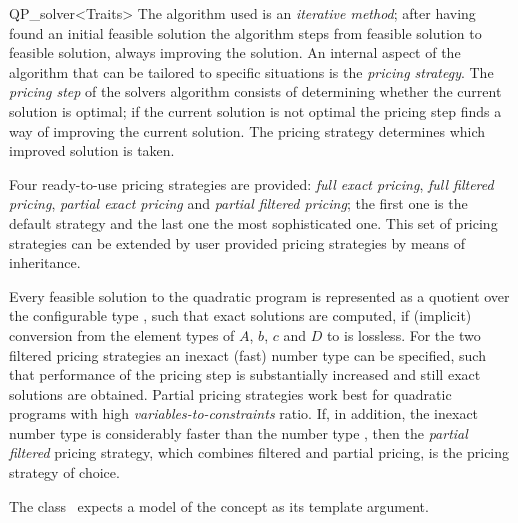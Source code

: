\begin{ccRefClass}{QP_solver<Traits>}
The algorithm used is an \emph{iterative method}; after having found an initial
feasible solution the algorithm steps from feasible solution to feasible
solution, always improving the solution.
An internal aspect of the algorithm that can be tailored to specific situations
is the \emph{pricing strategy}.
The \emph{pricing step} of the solvers algorithm consists of determining 
whether the current solution is optimal; if the current solution is not optimal
the pricing step finds a way of improving the current solution. The pricing
strategy determines which improved solution is taken.


Four ready-to-use pricing strategies are provided: \emph{full exact pricing},
\emph{full filtered pricing}, \emph{partial exact pricing} and
\emph{partial filtered pricing};
the first one is the default strategy and the last one the most sophisticated
one.
This set of pricing strategies can be extended by user provided pricing
strategies by means of inheritance.

Every feasible solution to the quadratic program  is represented as a
quotient over the configurable type , such that exact
solutions are computed, if (implicit)
conversion from the element types of $A$, $b$, $c$ and $D$ to 
is lossless. For the two filtered pricing strategies an inexact (fast) number
type  can be specified, such that performance of the pricing step is
substantially increased and still exact solutions are obtained.
Partial pricing strategies work best
for quadratic programs with high \emph{variables-to-constraints} ratio.
If, in addition, the inexact number type  is considerably faster
than the number type , then the \emph{partial filtered} pricing
strategy, which combines filtered and partial pricing,
is the pricing strategy of choice.  
   



\ccRequirements
\ccIndexRequirements

The class \ccRefName\ expects a model of the concept
 as its template argument.

\ccTypes \ccIndexClassTypes






\end{ccRefClass}
